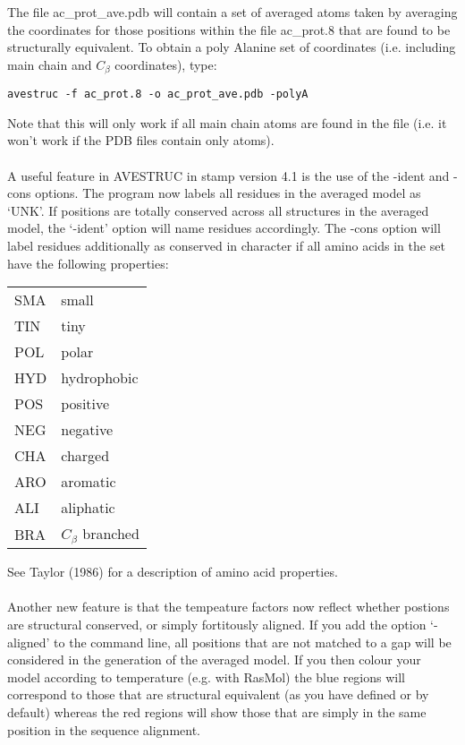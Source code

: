The file ac\_prot\_ave.pdb will contain a set of averaged \Cal atoms taken 
by averaging the coordinates for those positions within the file 
ac\_prot.8 that are found to be structurally equivalent.  To obtain a poly 
Alanine set of coordinates (i.e. including main chain and $C_{\beta}$ 
coordinates), type:\\

\begin{scriptsize}\begin{verbatim}
avestruc -f ac_prot.8 -o ac_prot_ave.pdb -polyA
\end{verbatim} \end{scriptsize}

Note that this will only work if all main chain atoms are found in the file
(i.e. it won't work if the PDB files contain only \Cal atoms).\\
\\
A useful feature in AVESTRUC in stamp version 4.1 is the use of the -ident
and -cons options.  The program now labels all residues in the averaged model 
as `UNK'.  If positions are totally conserved across all structures in the
averaged model, the `-ident' option will name residues accordingly.  The -cons
option will label residues additionally as conserved in character if all
amino acids in the set have the following properties:\\

\begin{tabular}{ll}
SMA & small \\
TIN & tiny \\
POL & polar \\
HYD & hydrophobic \\
POS & positive \\
NEG & negative \\
CHA & charged \\
ARO & aromatic \\
ALI & aliphatic \\
BRA & $C_{\beta}$ branched \\
\end{tabular}

See Taylor (1986) for a description of amino acid properties.\\ 
\nocite{taylor86a}
\\
Another new feature is that the tempeature factors now reflect whether
postions are structural conserved, or simply fortitously aligned.  If you
add the option `-aligned' to the command line, all positions that are
not matched to a gap will be considered in the generation of the
averaged model.  If you then colour your model according to temperature
(e.g. with RasMol) the blue regions will correspond to those that
are structural equivalent (as you have defined or by default) whereas
the red regions will show those that are simply in the same position in
the sequence alignment.


